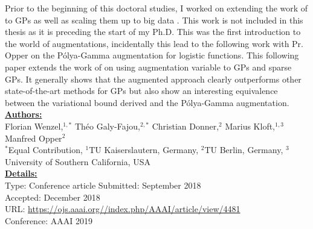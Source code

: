 


\graphicspath{{3/figures/}}

Prior to the beginning of this doctoral studies, I worked on extending the work of \citet{henaoBayesianNonlinearSupport2014} to \ac{GPs} as well as scaling them up to big data \cite{wenzel2017bayesian}.
This work is not included in this thesis as it is preceding the start of my Ph.D.
This was the first introduction to the world of augmentations, incidentally this lead to the following work with Pr. Opper on the P\'olya-Gamma augmentation for logistic functions.
This following paper extends the work of \citet{polsonBayesianInferenceLogistic2012} on using augmentation variable to \ac{GPs} and sparse \ac{GPs}.
It generally shows that the augmented approach clearly outperforms other state-of-the-art methods for \ac{GPs} but also show an interesting equivalence between the variational bound derived \citet{jaakkolaBayesianParameterEstimation2000} and the P\'olya-Gamma augmentation.\\

\textbf{\underline{Authors:}}\\
Florian Wenzel,$^{1,*}$ Th\'eo Galy-Fajou,$^{2,*}$ Christian Donner,$^{2}$ Marius Kloft,$^{1,3}$ Manfred Opper$^2$\\
\small{$^*$Equal Contribution, $^1$TU Kaiserslautern, Germany, $^2$TU Berlin, Germany, $^3$University of Southern California, USA}\\

\textbf{\underline{Details:}}\\
Type: Conference article
Submitted: September 2018\\
Accepted: December 2018\\
URL: \url{https://ojs.aaai.org//index.php/AAAI/article/view/4481}\\
Conference: AAAI 2019\\


